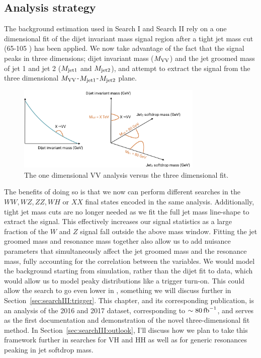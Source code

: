 \subsection{Analysis strategy}
The background estimation used in Search I and Search II rely on a one dimensional fit of the dijet invariant mass signal region after a tight jet mass cut (65-105 \GeV) has been applied.
We now take advantage of the fact that the signal peaks in three dimensions; dijet invariant mass ($M_{\rm VV}$) and the jet groomed mass of jet 1 and jet 2 ($M_{\rm jet1}$ and $M_{\rm jet2}$),
and attempt to extract the signal from the three dimensional $M_{\rm VV}$-$M_{\rm jet1}$-$M_{\rm jet2}$ plane.
\begin{figure}[h!] 
    \centering
    \includegraphics[width=0.79\textwidth]{figures/analysis/search3/misc/1Dvs3D.png}
    \caption{The one dimensional VV analysis versus the three dimensional fit.}
    \label{fig:searchIII:1Dvs3D}
\end{figure}
The benefits of doing so is that we now can perform different searches in the $WW, WZ, ZZ, WH$ or $XX$ final states encoded in the same analysis.
Additionally, tight jet mass cuts are no longer needed as we fit the full jet mass line-shape to extract the signal. This effectively increases our signal statistics
as a large fraction of the $W$ and $Z$ signal fall outside the above mass window.
Fitting the jet groomed mass and resonance mass together also allow us to add nuisance parameters that simultaneously affect the jet groomed mass and the resonance mass, fully accounting for the correlation between the variables.
We would model the background starting from simulation, rather than the dijet fit to data, which would allow us to model peaky distributions like a trigger turn-on. This could allow the search to go even lower in \MVV, something we will discuss further in Section~\ref{sec:searchIII:trigger}. \newline
This chapter, and its corresponding publication, is an analysis of the 2016 and 2017 dataset, corresponding to $\sim 80 \mbox{\ensuremath{\,\text{fb}^\text{$-$1}}}$, and serves as the first documentation and demonstration of the novel three-dimensional fit method. In Section~\ref{sec:searchIII:outlook}, I'll discuss how we plan to take this framework further in searches for VH and HH as well as for generic resonances peaking in jet softdrop mass.
